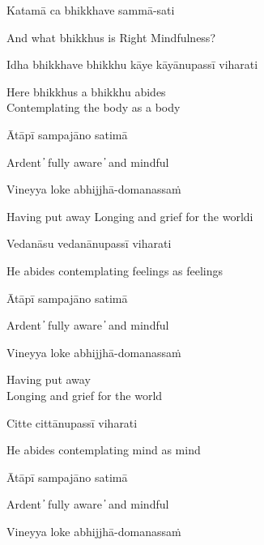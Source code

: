 Katamā ca bhikkhave sammā-sati

\begin{cprenglish}
  And what bhikkhus is Right Mindfulness?
\end{cprenglish}

Idha bhikkhave bhikkhu kāye kāyānupassī viharati

\begin{cprenglish}
  Here bhikkhus a bhikkhu abides\\
  Contemplating the body as a body
\end{cprenglish}

Ātāpī sampajāno satimā

\begin{cprenglish}
  Ardent  ̓  fully aware  ̓  and mindful
\end{cprenglish}

Vineyya loke abhijjhā-domanassaṁ

\begin{cprenglish}
  Having put away
  Longing and grief for the worldi
\end{cprenglish}

Vedanāsu vedanānupassī viharati

\begin{cprenglish}
  He abides contemplating feelings as feelings
\end{cprenglish}

Ātāpī sampajāno satimā

\begin{cprenglish}
  Ardent  ̓  fully aware  ̓  and mindful
\end{cprenglish}

Vineyya loke abhijjhā-domanassaṁ

\begin{cprenglish}
  Having put away\\
  Longing and grief for the world
\end{cprenglish}

Citte cittānupassī viharati

\begin{cprenglish}
  He abides contemplating mind as mind
\end{cprenglish}

Ātāpī sampajāno satimā

\begin{cprenglish}
  Ardent  ̓  fully aware  ̓  and mindful
\end{cprenglish}

Vineyya loke abhijjhā-domanassaṁ

